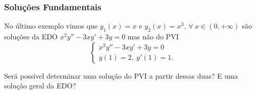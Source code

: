 %
%
%
%
%
%
%
%
%




\begin{frame}
\frametitle{ Soluções Fundamentais }
 No último exemplo vimos que $y_1(x)=x$ e $y_2(x)=x^3$, $\forall\ x\in (0,+\infty)$ são soluções da EDO $x^2y''-3xy'+3y=0$ mas não do PVI
\[\begin{cases}
 x^2y''-3xy'+3y=0\\
y(1)= 2,\  y'(1)=1.
\end{cases}
\]

Será possível determinar uma solução do PVI a partir dessas duas? E uma solução geral da EDO?

\end{frame}
%
%
%
%
%


